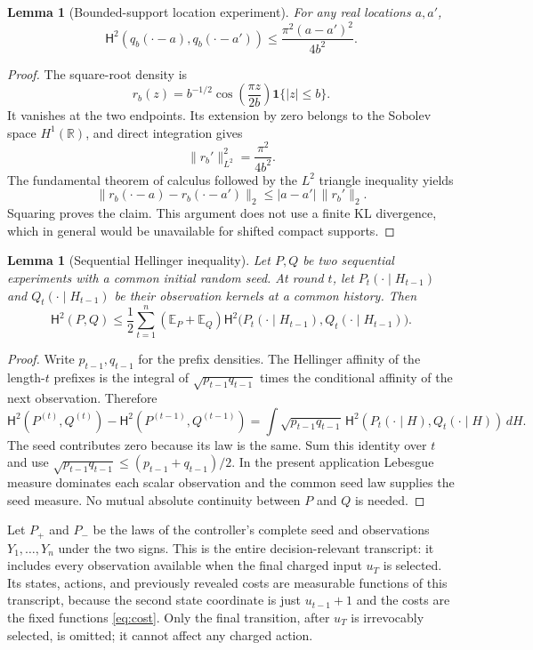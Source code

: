 \documentclass[11pt]{article}
\newtheorem{lemma}[theorem]{Lemma}
\theoremstyle{remark}
\newcommand{\E}{\mathbb E}
\newcommand{\R}{\mathbb R}
\newcommand{\one}{\mathbf 1}
\newcommand{\HH}{\mathsf H}
\begin{document}
\begin{lemma}[Bounded-support location experiment]\label{lem:location}
For any real locations $a,a'$,
\begin{equation}\label{eq:location}
 \HH^2(q_b(\cdot-a),q_b(\cdot-a'))
 \le\frac{\pi^2(a-a')^2}{4b^2}.
\end{equation}
\end{lemma}
\begin{proof}
The square-root density is
\[
 r_b(z)=b^{-1/2}\cos\!\left(\frac{\pi z}{2b}\right)\one\{|z|\le b\}.
\]
It vanishes at the two endpoints. Its extension by zero belongs to the Sobolev space $H^1(\R)$, and direct integration gives
\[
 \|r_b'\|_{L^2}^2=\frac{\pi^2}{4b^2}.
\]
The fundamental theorem of calculus followed by the $L^2$ triangle inequality yields
\[
 \|r_b(\cdot-a)-r_b(\cdot-a')\|_2
 \le |a-a'|\,\|r_b'\|_2.
\]
Squaring proves the claim. This argument does not use a finite KL divergence, which in general would be unavailable for shifted compact supports.
\end{proof}

\begin{lemma}[Sequential Hellinger inequality]\label{lem:chain}
Let $P,Q$ be two sequential experiments with a common initial random seed. At round $t$, let $P_t(\cdot\mid H_{t-1})$ and $Q_t(\cdot\mid H_{t-1})$ be their observation kernels at a common history. Then
\begin{equation}\label{eq:chain}
 \HH^2(P,Q)
 \le\frac12\sum_{t=1}^n
 \left(\E_P+\E_Q\right)
 \HH^2\bigl(P_t(\cdot\mid H_{t-1}),Q_t(\cdot\mid H_{t-1})\bigr).
\end{equation}
\end{lemma}
\begin{proof}
Write $p_{t-1},q_{t-1}$ for the prefix densities. The Hellinger affinity of the length-$t$ prefixes is the integral of $\sqrt{p_{t-1}q_{t-1}}$ times the conditional affinity of the next observation. Therefore
\[
 \HH^2(P^{(t)},Q^{(t)})-\HH^2(P^{(t-1)},Q^{(t-1)})
 =\int\sqrt{p_{t-1}q_{t-1}}\,
   \HH^2(P_t(\cdot\mid H),Q_t(\cdot\mid H))\,dH.
\]
The seed contributes zero because its law is the same. Sum this identity over $t$ and use $\sqrt{p_{t-1}q_{t-1}}\le(p_{t-1}+q_{t-1})/2$. In the present application Lebesgue measure dominates each scalar observation and the common seed law supplies the seed measure. No mutual absolute continuity between $P$ and $Q$ is needed.
\end{proof}

Let $P_+$ and $P_-$ be the laws of the controller's complete seed and observations $Y_1,\ldots,Y_n$ under the two signs. This is the entire decision-relevant transcript: it includes every observation available when the final charged input $u_T$ is selected. Its states, actions, and previously revealed costs are measurable functions of this transcript, because the second state coordinate is just $u_{t-1}+1$ and the costs are the fixed functions \eqref{eq:cost}. Only the final transition, after $u_T$ is irrevocably selected, is omitted; it cannot affect any charged action.
\end{document}
